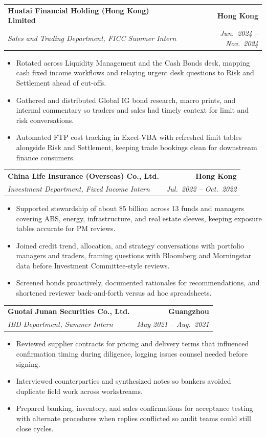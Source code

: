 \documentclass[9pt,a4paper]{extarticle}
\makeatletter
\newcommand{\resumeSubheading}[4]{%
  \vspace{0.6em}%
  \begin{tabular*}{\textwidth}{l@{\extracolsep{\fill}}r}
    \textbf{#1} & \textbf{#2} \\
    \textit{\small #3} & \textit{\small #4} \\
  \end{tabular*}\vspace{0.32em}}
\makeatother
\begin{document}
\resumeSubheading{Huatai Financial Holding (Hong Kong) Limited}{Hong Kong}{Sales and Trading Department, FICC Summer Intern}{Jun.\ 2024 -- Nov.\ 2024}
\begin{itemize}
  \item Rotated across Liquidity Management and the Cash Bonds desk, mapping cash fixed income workflows and relaying urgent desk questions to Risk and Settlement ahead of cut-offs.
  \item Gathered and distributed Global IG bond research, macro prints, and internal commentary so traders and sales had timely context for limit and risk conversations.
  \item Automated FTP cost tracking in Excel-VBA with refreshed limit tables alongside Risk and Settlement, keeping trade bookings clean for downstream finance consumers.
\end{itemize}

\resumeSubheading{China Life Insurance (Overseas) Co., Ltd.}{Hong Kong}{Investment Department, Fixed Income Intern}{Jul.\ 2022 -- Oct.\ 2022}
\begin{itemize}
  \item Supported stewardship of about \$5 billion across 13 funds and managers covering ABS, energy, infrastructure, and real estate sleeves, keeping exposure tables accurate for PM reviews.
  \item Joined credit trend, allocation, and strategy conversations with portfolio managers and traders, framing questions with Bloomberg and Morningstar data before Investment Committee-style reviews.
  \item Screened bonds proactively, documented rationales for recommendations, and shortened reviewer back-and-forth versus ad hoc spreadsheets.
\end{itemize}

\resumeSubheading{Guotai Junan Securities Co., Ltd.}{Guangzhou}{IBD Department, Summer Intern}{May 2021 -- Aug.\ 2021}
\begin{itemize}
  \item Reviewed supplier contracts for pricing and delivery terms that influenced confirmation timing during diligence, logging issues counsel needed before signing.
  \item Interviewed counterparties and synthesized notes so bankers avoided duplicate field work across workstreams.
  \item Prepared banking, inventory, and sales confirmations for acceptance testing with alternate procedures when replies conflicted so audit teams could still close cycles.
\end{itemize}
\end{document}
